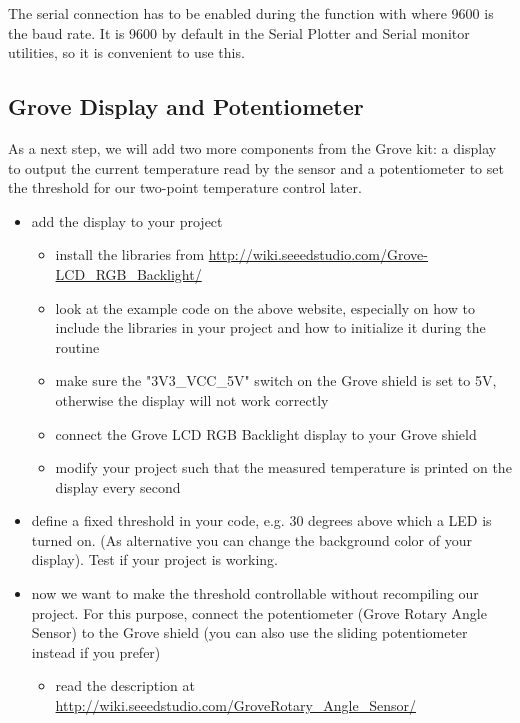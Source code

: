The serial connection has to be enabled during the  function with  where 9600 is the baud rate. It is 9600 by default in the Serial Plotter and Serial monitor utilities, so it is convenient to use this.


\subsection{Grove Display and Potentiometer}\label{sec:grovetemp}
As a next step, we will add two more components from the Grove kit: a display to output the current temperature read by the sensor and a potentiometer to set the threshold for our two-point temperature control later. 
\begin{itemize}
    \item add the display to your project
	\begin{itemize}
        \item install the libraries from \href{http://wiki.seeedstudio.com/Grove-LCD_RGB_Backlight/}{http://wiki.seeedstudio.com/Grove-LCD\_RGB\_Backlight/}
        \item look at the example code on the above website, especially on how to include the libraries in your project and how to initialize it during the  routine
        \item make sure the "3V3\_VCC\_5V" switch on the Grove shield is set to 5V, otherwise the display will not work correctly
	    \item connect the Grove LCD RGB Backlight display to your Grove shield
		\item modify your project such that the measured temperature is printed on the display every second 
	\end{itemize}
	\item define a fixed threshold in your code, e.g. 30 degrees above which a LED is turned on. (As alternative you can change the background color of your display). Test if your project is working.
	\item now we want to make the threshold controllable without recompiling our project. For this purpose, connect the potentiometer (Grove Rotary Angle Sensor) to the Grove shield (you can also use the sliding potentiometer instead if you prefer)
	\begin{itemize}
        \item read the description at \href{http://wiki.seeedstudio.com/Grove-Rotary_Angle_Sensor/}{http://wiki.seeedstudio.com/Grove\-Rotary\_Angle\_Sensor/}

\end{itemize}
\end{itemize}
